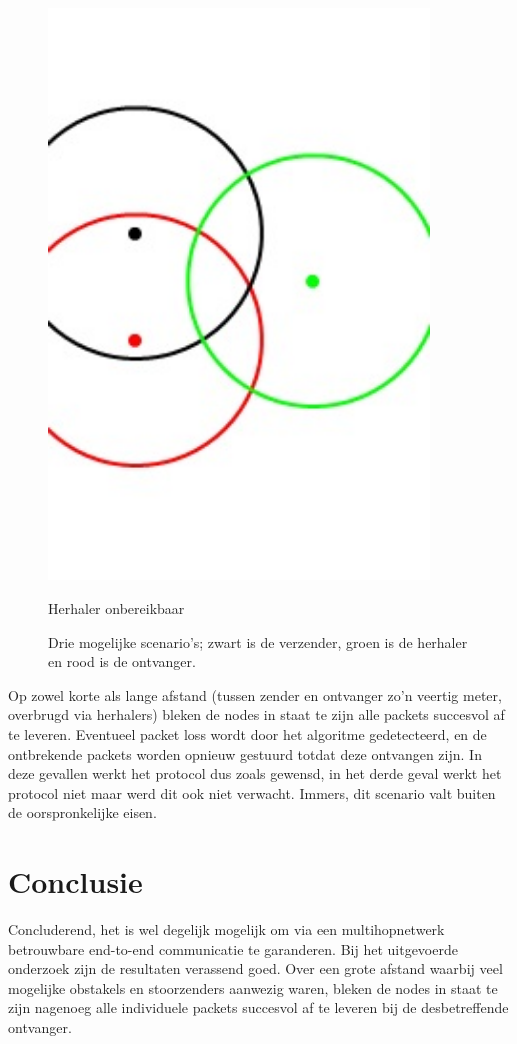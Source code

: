 \documentclass[a4paper,10pt]{article}
\begin{document}
\begin{figure}[ht!]
\begin{minipage}{\textwidth}
\begin{minipage}{0.3\textwidth}
            \includegraphics[width=0.9\textwidth]{drie.jpg}
            \caption*{Herhaler onbereikbaar}
        \end{minipage}
	\caption{Drie mogelijke scenario's; zwart is de verzender, groen is de herhaler en rood is de ontvanger.}
    \end{minipage}
\end{figure}

Op zowel korte als lange afstand (tussen zender en ontvanger zo'n veertig meter, overbrugd via herhalers) bleken de nodes in staat te zijn alle packets succesvol af te leveren. Eventueel packet loss wordt door het algoritme gedetecteerd, en de ontbrekende packets worden opnieuw gestuurd totdat deze ontvangen zijn. In deze gevallen werkt het protocol dus zoals gewensd, in het derde geval werkt het protocol niet maar werd dit ook niet verwacht. Immers, dit scenario valt buiten de oorspronkelijke eisen.

\section{Conclusie}
Concluderend, het is wel degelijk mogelijk om via een multihopnetwerk betrouwbare end-to-end communicatie te garanderen. Bij het uitgevoerde onderzoek zijn de resultaten verassend goed. Over een grote afstand waarbij veel mogelijke obstakels en stoorzenders aanwezig waren, bleken de nodes in staat te zijn nagenoeg alle individuele packets succesvol af te leveren bij de desbetreffende ontvanger.
\end{document}
